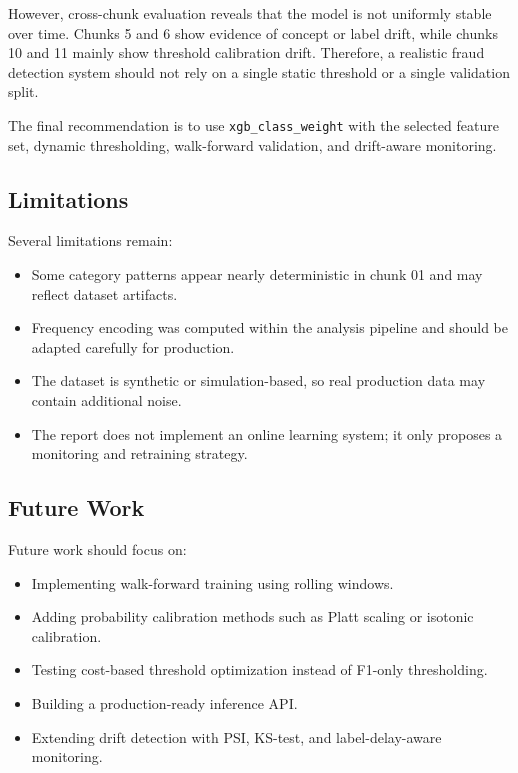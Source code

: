\documentclass[12pt,a4paper]{article}
\begin{document}
However, cross-chunk evaluation reveals that the model is not uniformly stable over time. Chunks 5 and 6 show evidence of concept or label drift, while chunks 10 and 11 mainly show threshold calibration drift. Therefore, a realistic fraud detection system should not rely on a single static threshold or a single validation split.

The final recommendation is to use \texttt{xgb\_class\_weight} with the selected feature set, dynamic thresholding, walk-forward validation, and drift-aware monitoring.

\subsection{Limitations}

Several limitations remain:
\begin{itemize}
    \item Some category patterns appear nearly deterministic in chunk 01 and may reflect dataset artifacts.
    \item Frequency encoding was computed within the analysis pipeline and should be adapted carefully for production.
    \item The dataset is synthetic or simulation-based, so real production data may contain additional noise.
    \item The report does not implement an online learning system; it only proposes a monitoring and retraining strategy.
\end{itemize}

\subsection{Future Work}

Future work should focus on:
\begin{itemize}
    \item Implementing walk-forward training using rolling windows.
    \item Adding probability calibration methods such as Platt scaling or isotonic calibration.
    \item Testing cost-based threshold optimization instead of F1-only thresholding.
    \item Building a production-ready inference API.
    \item Extending drift detection with PSI, KS-test, and label-delay-aware monitoring.
\end{itemize}
\end{document}
